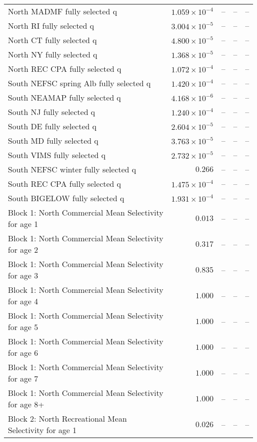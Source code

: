 \documentclass[
]{article}
\begin{document}
\begin{landscape}
\begin{longtable}[t]{lrrrr}
North MADMF fully selected q & $1.059\times 10^{-4}$ & -- & -- & --\\
North RI fully selected q & $3.004\times 10^{-5}$ & -- & -- & --\\
North CT fully selected q & $4.800\times 10^{-5}$ & -- & -- & --\\
\addlinespace
North NY fully selected q & $1.368\times 10^{-5}$ & -- & -- & --\\
North REC CPA fully selected q & $1.072\times 10^{-4}$ & -- & -- & --\\
South NEFSC spring Alb fully selected q & $1.420\times 10^{-4}$ & -- & -- & --\\
South NEAMAP fully selected q & $4.168\times 10^{-6}$ & -- & -- & --\\
South NJ fully selected q & $1.240\times 10^{-4}$ & -- & -- & --\\
\addlinespace
South DE fully selected q & $2.604\times 10^{-5}$ & -- & -- & --\\
South MD fully selected q & $3.763\times 10^{-5}$ & -- & -- & --\\
South VIMS fully selected q & $2.732\times 10^{-5}$ & -- & -- & --\\
South NEFSC winter fully selected q & $0.266$ & -- & -- & --\\
South REC CPA fully selected q & $1.475\times 10^{-4}$ & -- & -- & --\\
\addlinespace
South BIGELOW fully selected q & $1.931\times 10^{-4}$ & -- & -- & --\\
Block 1: North Commercial Mean Selectivity for age 1 & $0.013$ & -- & -- & --\\
Block 1: North Commercial Mean Selectivity for age 2 & $0.317$ & -- & -- & --\\
Block 1: North Commercial Mean Selectivity for age 3 & $0.835$ & -- & -- & --\\
Block 1: North Commercial Mean Selectivity for age 4 & $1.000$ & -- & -- & --\\
\addlinespace
Block 1: North Commercial Mean Selectivity for age 5 & $1.000$ & -- & -- & --\\
Block 1: North Commercial Mean Selectivity for age 6 & $1.000$ & -- & -- & --\\
Block 1: North Commercial Mean Selectivity for age 7 & $1.000$ & -- & -- & --\\
Block 1: North Commercial Mean Selectivity for age 8+ & $1.000$ & -- & -- & --\\
Block 2: North Recreational Mean Selectivity for age 1 & $0.026$ & -- & -- & --\\

\end{longtable}
\end{landscape}
\end{document}
